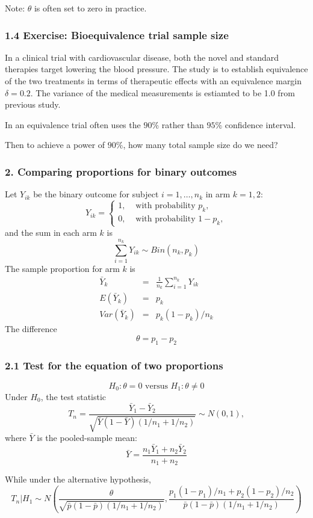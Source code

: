\documentclass[table,10pt]{beamer}
\begin{document}
\begin{CJK*}{UTF8}{gbsn}
\begin{frame}[t]
Note: $\theta$ is often set to zero in practice.
\end{frame}


\begin{frame}[t]
\frametitle{1.4 Exercise: Bioequivalence trial sample size}
In a clinical trial with cardiovascular disease, both the novel and 
standard therapies target lowering the blood pressure. The study is to 
establish equivalence of the two treatments in terms of therapeutic 
effects with an equivalence margin $\delta=0.2$. The variance of the 
medical measurements is estiamted to be 1.0 from previous study.

In an equivalence trial often uses the $90\%$ rather than $95\%$ 
confidence interval.

Then to achieve a power of $90\%$, how many total sample size do we need?
\end{frame}


\begin{frame}[t]
\frametitle{2. Comparing proportions for binary outcomes}
Let $Y_{ik}$ be the binary outcome for subject $i=1,\dots,n_k$ in arm $k=1,2$:
$$
Y_{ik} = \begin{cases}
1, & \mbox{ with probability } p_k,\\
0, & \mbox{ with probability } 1-p_k,
\end{cases}
$$
and the sum in each arm $k$ is
$$
\sum_{i=1}^{n_k} Y_{ik} \sim Bin(n_k, p_k)
$$
The sample proportion for arm $k$ is
$$
\begin{array}{lcl}
\bar{Y}_k &=& \frac{1}{n_k} \sum_{i=1}^{n_k} Y_{ik}\\
E(\bar{Y}_k) &=& p_k\\
Var(\bar{Y}_k) &=& p_k(1-p_k)/n_k
\end{array}
$$
The difference
$$
\theta = p_1 - p_2
$$
\end{frame}


\begin{frame}[t]
\frametitle{2.1 Test for the equation of two proportions}
$$
H_0: \theta = 0 \mbox{ versus } H_1: \theta \neq 0
$$
Under $H_0$, the test statistic
$$
T_n = \frac{\bar{Y}_1 - \bar{Y}_2}{\sqrt{\bar{Y}(1-\bar{Y})(1/n_1 + 1/n_2)}} \sim N(0, 1),
$$
where $\bar{Y}$ is the pooled-sample mean:
$$
\bar{Y} = \frac{n_1 \bar{Y}_1 + n_2 \bar{Y}_2}{n_1 + n_2}
$$

While under the alternative hypothesis,
$$
T_n \big| H_1 \sim N \left(\frac{\theta}{\sqrt{\bar{p}(1-\bar{p})(1/n_1 + 1/n_2)}}, \frac{p_1(1-p_1)/n_1 + p_2(1-p_2)/n_2}{\bar{p}(1-\bar{p})(1/n_1 + 1/n_2)}\right)
$$
\end{frame}



\end{CJK*}
\end{document}
